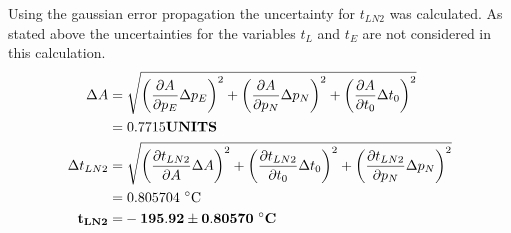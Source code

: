     Using the gaussian error propagation the uncertainty for $t_{LN2}$ was calculated. As stated above
    the uncertainties for the variables $t_L$ and $t_E$ are not considered in this calculation.
    \begin{align}
        \Delta A =& \; \sqrt{ \left(\frac{\partial A}{\partial p_E} \Delta p_E \right)^2 +
                            \left(\frac{\partial A}{\partial p_N} \Delta p_N \right)^2 +
                            \left(\frac{\partial A}{\partial t_0} \Delta t_0 \right)^2 }\\
        =& \; 0.7715 \textbf{UNITS}\\
        \Delta t_{LN2} =& \; \sqrt{ \left(\frac{\partial t_{LN2}}{\partial A} \Delta A \right)^2 +
                                    \left(\frac{\partial t_{LN2}}{\partial t_0} \Delta t_0 \right)^2 +
                                    \left(\frac{\partial t_{LN2}}{\partial p_N} \Delta p_N \right)^2 }\\
        =& \; 0.805704~\si{\celsius}\\
        \bf t_{LN2} =& \bf -195.92 \pm 0.80570 ~\si{\bf\celsius} \label{res_tN}
    \end{align}






